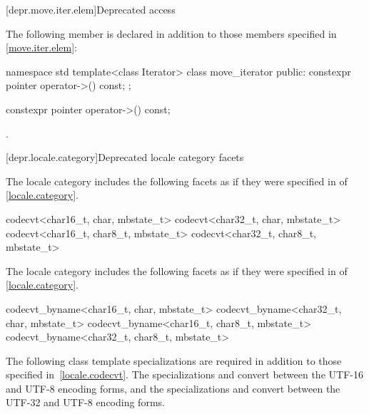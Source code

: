 [depr.move.iter.elem]{Deprecated  access}

\pnum
The following member is declared in addition to those members
specified in \ref{move.iter.elem}:

\begin{codeblock}
namespace std {
  template<class Iterator>
  class move_iterator {
  public:
    constexpr pointer operator->() const;
  };
}
\end{codeblock}

%
\begin{itemdecl}
constexpr pointer operator->() const;
\end{itemdecl}

\begin{itemdescr}
\pnum
\returns
{}.
\end{itemdescr}

[depr.locale.category]{Deprecated locale category facets}

\pnum
The  locale category includes the following facets
as if they were specified
in  of \ref{locale.category}.

\begin{codeblock}
codecvt<char16_t, char, mbstate_t>
codecvt<char32_t, char, mbstate_t>
codecvt<char16_t, char8_t, mbstate_t>
codecvt<char32_t, char8_t, mbstate_t>
\end{codeblock}

\pnum
The  locale category includes the following facets
as if they were specified
in  of \ref{locale.category}.

\begin{codeblock}
codecvt_byname<char16_t, char, mbstate_t>
codecvt_byname<char32_t, char, mbstate_t>
codecvt_byname<char16_t, char8_t, mbstate_t>
codecvt_byname<char32_t, char8_t, mbstate_t>
\end{codeblock}

\pnum
The following class template specializations are required
in addition to those specified in~\ref{locale.codecvt}.
%
%
The specializations  and
convert between the UTF-16 and UTF-8 encoding forms, and
%
the specializations  and
convert between the UTF-32 and UTF-8 encoding forms.

